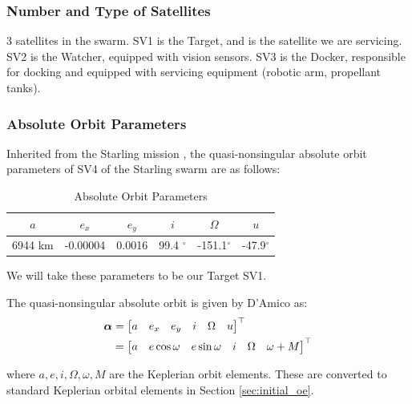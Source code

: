 \subsubsection{Number and Type of Satellites}
3 satellites in the swarm. SV1 is the Target, and is the satellite we are servicing. SV2 is the Watcher, equipped with vision sensors. SV3 is the Docker, responsible for docking and equipped with servicing equipment (robotic arm, propellant tanks).

\subsubsection{Absolute Orbit Parameters}
Inherited from the Starling mission \cite{krugerorbit}, the quasi-nonsingular absolute orbit parameters of SV4 of the Starling swarm are as follows:
\begin{table}[h]
\centering
\begin{tabular}{cccccc} \hline
    $a$ & $e_x$ & $e_y$ & $i$ & $\Omega$ & $u$ \\ \hline 
     6944 km & -0.00004 & 0.0016 & 99.4 $^\circ$ & -151.1$^\circ$ & -47.9$^\circ$ \\ \hline
\end{tabular}
\caption{Absolute Orbit Parameters}
\label{tab:abs_oe}
\end{table}

We will take these parameters to be our Target SV1. 

The quasi-nonsingular absolute orbit is given by D'Amico \cite{damicothesis} as:
\begin{align}
\boldsymbol{\alpha} &= 
\begin{bmatrix}
a & e_x & e_y & i & \Omega & u
\end{bmatrix}^\top \notag \\
&= 
\begin{bmatrix}
a & e \cos \omega & e \sin \omega & i & \Omega & \omega + M
\end{bmatrix}^\top
\end{align}

where $a, e, i, \Omega, \omega, M$ are the Keplerian orbit elements. These are converted to standard Keplerian orbital elements in Section \ref{sec:initial_oe}.

